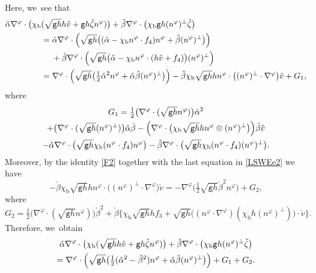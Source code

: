 \documentclass[JEP,XML,SOM,Unicode,NoFloatCountersInSection,published]{cedram}
\newcommand{\gr}{{\mathtt g}}
\theoremstyle{definition}
\begin{document}
Here, we~see that
\begin{align*}
\check{\alpha}\nabla^\varphi\cdot\bigl(\chi_\mathrm{b}&(\sqrt{\gr h}h\check{v} + \gr h\check{\zeta}n^\varphi)\bigr)
+ \check{\beta}\nabla^\varphi\cdot\bigl(\chi_\mathrm{b}\gr h(n^\varphi)^\perp\check{\zeta}\bigr) \\
&= \check{\alpha}\nabla^\varphi\cdot\Bigl(\sqrt{\gr h}\bigl((\check{\alpha}-\chi_\mathrm{b}n^\varphi\cdot f_4)n^\varphi + \check{\beta}(n^\varphi)^\perp\bigr)\Bigr) \\
&\quad\; + \check{\beta}\nabla^\varphi\cdot\Bigl(\sqrt{\gr h}\bigl(\check{\alpha}-\chi_\mathrm{b}n^\varphi\cdot(h\check{v}+f_4)\bigr) (n^\varphi)^\perp\Bigr) \\
&= \nabla^\varphi\cdot\Bigl(\sqrt{\gr h}\bigl(\tfrac12\check{\alpha}^2n^\varphi + \check{\alpha}\check{\beta}(n^\varphi)^\perp\bigr)\Bigr)
- \check{\beta}\chi_\mathrm{b}\sqrt{\gr h}h n^\varphi\cdot\bigl((n^\varphi)^\perp\cdot\nabla^\varphi\bigr)\check{v} + G_1,
\end{align*}
where
\begin{multline*}
G_1
= \tfrac12\bigl(\nabla^\varphi\cdot(\sqrt{\gr h}n^\varphi)\bigr)\check{\alpha}^2\\
+ \bigl(\nabla^\varphi\cdot(\sqrt{\gr h}(n^\varphi)^\perp)\bigr)\check{\alpha}\check{\beta}
- \Bigl(\nabla^\varphi\cdot\bigl(\chi_\mathrm{b}\sqrt{\gr h}h n^\varphi\otimes(n^\varphi)^\perp\bigr)\Bigr)\check{\beta}\check{v}\\
- \check{\alpha}\nabla^\varphi\cdot\bigl(\sqrt{\gr h}\chi_\mathrm{b}(n^\varphi\cdot f_4)n^\varphi\bigr)
- \check{\beta}\nabla^\varphi\cdot\bigl(\sqrt{\gr h}\chi_\mathrm{b}(n^\varphi\cdot f_4)(n^\varphi)^\perp\bigr).
\end{multline*}
Moreover, by the identity \eqref{F2} together with the last equation in \eqref{LSWEe2} we have
\[
- \check{\beta}\chi_\mathrm{b}\sqrt{\gr h}h n^\varphi\cdot\bigl((n^\varphi)^\perp\cdot\nabla^\varphi\bigr)\check{v}
= -\nabla^\varphi\bigl(\tfrac12\sqrt{\gr h}\check{\beta}^2n^\varphi\bigr) + G_2,
\]
where
\[
G_2 = \tfrac12\bigl(\nabla^\varphi\cdot(\sqrt{\gr h} n^\varphi)\bigr)\check{\beta}^2
+ \check{\beta}\bigl\{ \chi_\mathrm{b}\sqrt{\gr h}hf_3 + \sqrt{\gr h}\bigl((n^\varphi\cdot\nabla^\varphi)(\chi_\mathrm{b}h(n^\varphi)^\perp)\bigr)\cdot\check{v} \bigr\}.
\]
Therefore, we~obtain
\begin{multline}\label{EqCF2}
\check{\alpha}\nabla^\varphi\cdot\bigl(\chi_\mathrm{b}(\sqrt{\gr h}h\check{v} + \gr h\check{\zeta}n^\varphi)\bigr)
+ \check{\beta}\nabla^\varphi\cdot\bigl(\chi_\mathrm{b}\gr h(n^\varphi)^\perp\check{\zeta}\bigr) \\
= \nabla^\varphi\cdot\Bigl(\sqrt{\gr h}\bigl(\tfrac12(\check{\alpha}^2-\check{\beta}^2)n^\varphi + \check{\alpha}\check{\beta}(n^\varphi)^\perp\bigr)\Bigr) + G_1 + G_2.
\end{multline}
\end{document}
